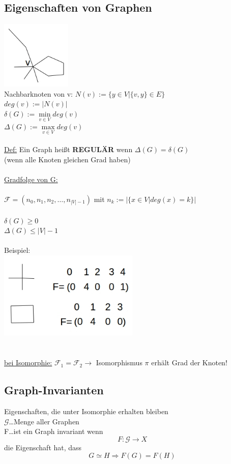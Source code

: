 \subsection{Eigenschaften von Graphen}
\includegraphics[width=0.25\textwidth]{lectures/161014/pix/8.jpg}\\
Nachbarknoten von v: $N(v):=\{y \in V|\{v,y\} \in E\}$\\
$deg(v):=|N(v)|$\\
$\delta(G):= \min \limits_{v \in V} deg(v)$\\
$\Delta(G):= \max \limits_{v \in V} deg(v)$\\
\\
\underline{Def:} Ein Graph heißt \textbf{REGULÄR} wenn $\Delta(G)=\delta(G)$\\(wenn alle Knoten gleichen Grad haben)
\\\\
\underline{Gradfolge von G:}\\\\
$\mathcal{F}=(n_0,n_1,n_2,…,n_{|V|-1})$ mit $n_k:=|\{x \in V|deg(x)=k\}|$\\\\
$\delta(G) \geq 0$\\
$\Delta(G) \leq |V|-1$\\\\
Beispiel:\\
\includegraphics[width=0.5\textwidth]{lectures/161014/pix/9.jpg}\\
\\\\
\underline{bei Isomorphie:} $\mathcal{F}_1=\mathcal{F}_2 \rightarrow$ Isomorphismus $\pi$ erhält Grad der Knoten!

\subsection{Graph-Invarianten}
Eigenschaften, die unter Isomorphie erhalten bleiben\\
$\mathcal{G}$…Menge aller Graphen\\
F…ist ein Graph invariant wenn\\
\begin{equation}
	F:\mathcal{G} \rightarrow X
\end{equation}
die Eigenschaft hat, dass
\begin{equation}
	G \simeq H \Rightarrow F(G) = F(H)
\end{equation}

